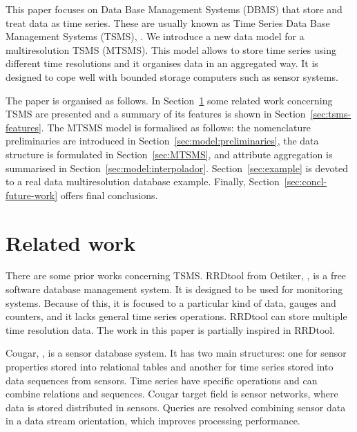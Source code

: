 
This paper focuses on Data Base Management Systems (DBMS) that store
and treat data as time series. These are usually known as Time Series
Data Base Management Systems (TSMS), \cite{dreyer94}.  We introduce a
new data model for a multiresolution TSMS (MTSMS). This model allows
to store time series using different time resolutions and it organises
data in an aggregated way. It is designed to cope well with bounded
storage computers such as sensor systems.

The paper is organised as follows.  In Section~\ref{sec:related-work}
some related work concerning TSMS are presented and a summary of its
features is shown in Section~\ref{sec:tsms-features}.  The MTSMS model
is formalised as follows: the nomenclature preliminaries are
introduced in Section~\ref{sec:model:preliminaries}, the data
structure is formulated in Section~\ref{sec:MTSMS}, and attribute
aggregation is summarised in
Section~\ref{sec:model:interpolador}. Section~\ref{sec:example} is
devoted to a real data multiresolution database example. Finally,
Section~\ref{sec:concl-future-work} offers final
conclusions.%



\section{Related work}
\label{sec:related-work}

There are some prior works concerning TSMS. 
%
RRDtool from Oetiker, \cite{rrdtool}, is a free software database
management system. It is designed to be used for monitoring
systems. Because of this, it is focused to a particular kind of data,
gauges and counters, and it lacks general time series
operations. RRDtool can store multiple time resolution data. The work
in this paper is partially inspired in RRDtool.

Cougar, \cite{bonnet01}, is a sensor database system. It has two main
structures: one for sensor properties stored into relational tables
and another for time series stored into data sequences from
sensors. Time series have specific operations and can combine
relations and sequences. Cougar target field is sensor networks, where
data is stored distributed in sensors. Queries are resolved combining
sensor data in a data stream orientation, which improves processing
performance.

